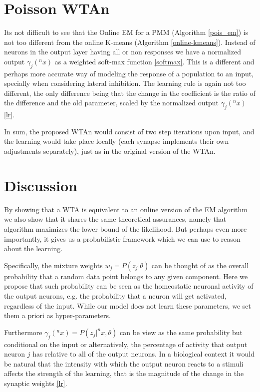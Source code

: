 \documentclass{article}
\begin{document}
\section{Poisson WTAn}
Its not difficult to see that the Online EM for a PMM (Algorithm \ref{pois_em}) is not too different from the online K-means (Algorithm \ref{online-kmeans}). Instead of neurons in the output layer having all or non responses we have a normalized output $\gamma_j(^nx)$ as a weighted soft-max function \eqref{softmax}. This is a different and perhaps more accurate way of modeling the response of a population to an input, specially when considering lateral inhibition. The learning rule is again not too different, the only difference being that the change in the coefficient is the ratio of the difference and the old parameter, scaled by the normalized output $\gamma_j(^nx)$ \eqref{lr}. 

In sum, the proposed WTAn would consist of two step iterations upon input, and the learning would take place locally (each synapse implements their own adjustments separately), just as in the original version of the WTAn.

\section{Discussion}
By showing that a WTA is equivalent to an online
version of the EM algorithm we also show that it shares the same
theoretical assurances, namely that algorithm maximizes the lower bound
of the likelihood. But perhaps even more importantly, it gives us a
probabilistic framework which we can use to reason about the learning.

Specifically, the mixture weights \(w_j = P(z_j | \theta)\) can be
thought of as the overall probability that a random data point belongs
to any given component. Here we propose that such probability can be
seen as the homeostatic neuronal activity of the output neurons,
e.g. the probability that a neuron will get activated, regardless of the
input. While our model does not learn these parameters, we set them
a priori as hyper-parameters.

Furthermore \(\gamma_j(^nx) = P (z_j | ^nx, \theta)\) can be view as the
same probability but conditional on the input or alternatively, the
percentage of activity that output neuron \(j\) has relative to all of
the output neurons. In a biological context it would be natural that the
intensity with which the output neuron reacts to a stimuli affects the
strength of the learning, that is the magnitude of the change in the
synaptic weights \eqref{lr}. 
\end{document}
